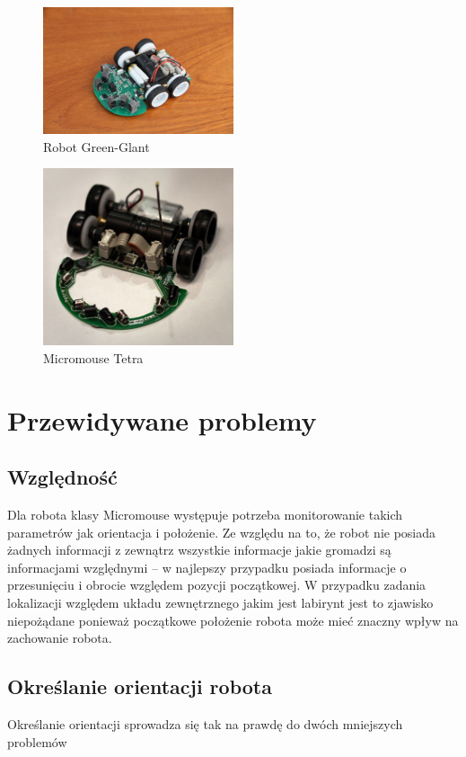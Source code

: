 \documentclass[12pt,a4paper,twoside,openright,fleqn]{mwrep}
\begin{document}
\begin{figure}[h]
\centering
\includegraphics[width=0.5\textwidth]{./images/green_glant}
\caption{Robot Green-Glant}
\label{green_glant}
\end{figure}

\begin{figure}[h]
\centering
\includegraphics[width=0.5\textwidth]{./images/tetra}
\caption{Micromouse Tetra}
\label{tetra}
\end{figure}

\section{Przewidywane problemy} 

\subsection{Względność}
Dla robota klasy Micromouse występuje potrzeba monitorowanie takich parametrów jak orientacja i położenie. Ze względu na to, że robot nie posiada żadnych informacji z zewnątrz wszystkie informacje jakie gromadzi są informacjami względnymi -- w najlepszy przypadku posiada informacje o przesunięciu i obrocie względem pozycji początkowej. W przypadku zadania lokalizacji względem układu zewnętrznego jakim jest labirynt jest to zjawisko niepożądane ponieważ początkowe położenie robota może mieć znaczny wpływ na zachowanie robota. 

\subsection{Określanie orientacji robota} 
Określanie orientacji sprowadza się tak na prawdę do dwóch mniejszych problemów 
\end{document}
